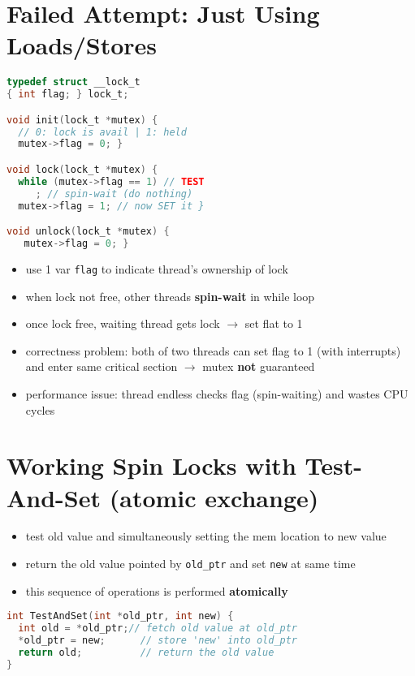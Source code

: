 \documentclass[8pt,a4paper,landscape]{extarticle}
\begin{document}
\begin{multicols*}{3}
\section*{Failed Attempt: Just Using Loads/Stores}
\begin{minipage}{.5\linewidth}
\begin{lstlisting}[language=c,xrightmargin=2pt]
typedef struct __lock_t
{ int flag; } lock_t;

void init(lock_t *mutex) {
  // 0: lock is avail | 1: held
  mutex->flag = 0; }

void lock(lock_t *mutex) {
  while (mutex->flag == 1) // TEST
     ; // spin-wait (do nothing)
  mutex->flag = 1; // now SET it }

void unlock(lock_t *mutex) {
   mutex->flag = 0; }
\end{lstlisting}
\end{minipage}
\begin{minipage}{.5\linewidth}
  \begin{itemize}
  \item use 1 var \texttt{flag} to indicate thread's ownership of lock
  \item when lock not free, other threads \textbf{spin-wait} in while loop
  \item once lock free, waiting thread gets lock $\to$ set flat to 1
  \item correctness problem: both of two threads can set flag to 1 (with interrupts) and enter same critical section $\to$ mutex \textbf{not} guaranteed
  \item performance issue: thread endless checks flag (spin-waiting) and wastes CPU cycles
  \end{itemize}
\end{minipage}
\section*{Working Spin Locks with Test-And-Set (atomic exchange)}
\begin{itemize}
\item test old value and simultaneously setting the mem location to new value
\item return the old value pointed by \texttt{old\_ptr} and set \texttt{new} at same time
\item this sequence of operations is performed \textbf{atomically}
\end{itemize}
\begin{minipage}{.7\linewidth}
\begin{lstlisting}[language=c]
int TestAndSet(int *old_ptr, int new) {
  int old = *old_ptr;// fetch old value at old_ptr
  *old_ptr = new;      // store 'new' into old_ptr
  return old;          // return the old value
}


\end{lstlisting}
\end{minipage}
\end{multicols*}
\end{document}
